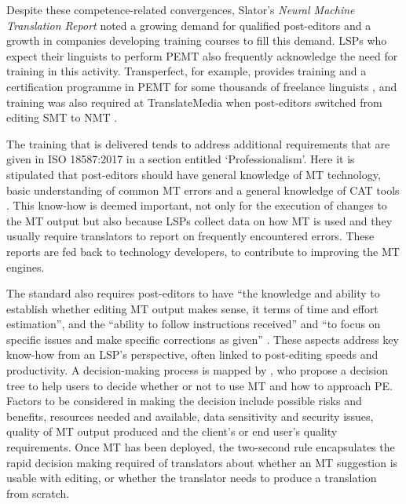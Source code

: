 \documentclass[output=paper,colorlinks,citecolor=brown]{langsci/langscibook}
\begin{document}
\hspace*{-1mm}Despite these competence-related convergences, Slator’s \textit{Neural Machine Translation Report} \citep{slator_neural_2019} noted a growing demand for qualified post-editors and a growth in companies developing training courses to fill this demand. LSPs who expect their linguists to perform PEMT also frequently acknowledge the need for training in this activity. Transperfect, for example, provides training and a certification programme in PEMT for some thousands of freelance linguists \citep[137]{zaretskaya_optimising_2019}, and training was also required at TranslateMedia when post-editors switched from editing SMT to NMT \citep[170]{kosmaczewska_application_2019}.

The training that is delivered tends to address additional requirements that are given in ISO 18587:2017 in a section entitled ‘Professionalism’. Here it is stipulated that post-editors should have general knowledge of MT technology, basic understanding of common MT errors and a general knowledge of CAT tools \citep[8]{british_standards_institution_iso_2017}. This know-how is deemed important, not only for the execution of changes to the MT output but also because LSPs collect data on how MT is used and they usually require translators to report on frequently encountered errors. These reports are fed back to technology developers, to contribute to improving the MT engines. 

The standard also requires post-editors to have \enquote{the knowledge and ability to establish whether editing MT output makes sense, it terms of time and effort estimation}, and the \enquote{ability to follow instructions received} and \enquote{to focus on specific issues and make specific corrections as given} \citep[8]{british_standards_institution_iso_2017}. These aspects address key know-how from an LSP’s perspective, often linked to post-editing speeds and productivity. A decision-making process is mapped by \citet{nitzke_risk_2019}, who propose a decision tree to help users to decide whether or not to use MT and how to approach PE. Factors to be considered in making the decision include possible risks and benefits, resources needed and available, data sensitivity and security issues, quality of MT output produced and the client’s or end user’s quality requirements. Once MT has been deployed, the two-second rule \citep{graciet_translator_2018} encapsulates the rapid decision making required of translators about whether an MT suggestion is usable with editing, or whether the translator needs to produce a translation from scratch. 
\end{document}
